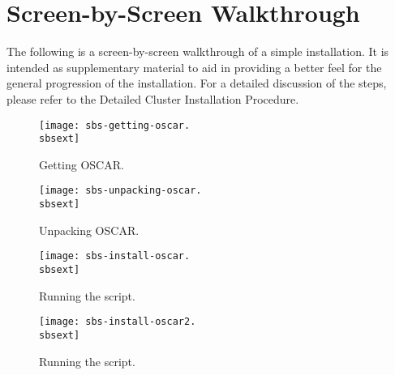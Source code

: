 %
%
%

\newpage

\section{Screen-by-Screen Walkthrough}
\label{app:screen-by-screen}

The following is a screen-by-screen walkthrough of a simple installation.
It is intended as supplementary material to aid in providing a better feel
for the general progression of the installation.  For a detailed discussion
of the steps, please refer to the Detailed Cluster Installation Procedure.

\setlength{\oddsidemargin}{-0.5in}
\setlength{\evensidemargin}{-0.5in}
\setlength{\textwidth}{7.5in}

\begin{figure}[htbp]
  \begin{center}
    \texttt{[image: sbs-getting-oscar.\\sbsext]}
    \caption{Getting OSCAR.}
    \label{fig:sbs-getting-oscar}
  \end{center}
\end{figure}

\begin{figure}[htbp]
  \begin{center}
    \texttt{[image: sbs-unpacking-oscar.\\sbsext]}
    \caption{Unpacking OSCAR.}
    \label{fig:sbs-unpacking-oscar}
  \end{center}
\end{figure}

\begin{figure}[htbp]
  \begin{center}
    \texttt{[image: sbs-install-oscar.\\sbsext]}
    \caption{Running the  script.}
    \label{fig:sbs-install-oscar}
  \end{center}
\end{figure}

\begin{figure}[htbp]
  \begin{center}
    \texttt{[image: sbs-install-oscar2.\\sbsext]}
    \caption{Running the  script.}
    \label{fig:sbs-install-oscar2}
  \end{center}
\end{figure}

